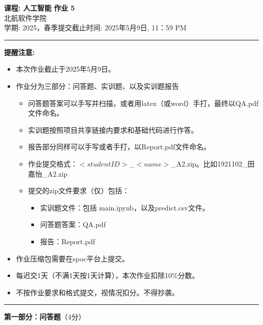 \documentclass[a4paper, 11pt]{article}
\begin{document}
\begin{CJK}{UTF8}{gbsn}
\noindent
\large\textbf{课程: 人工智能} \hfill \textbf{作业 5}   \\
北航软件学院 \\
\normalsize 学期: 2025，春季\hfill 提交截止时间:  2025年5月9日, 11：59 PM \\
\noindent\rule{7in}{2.8pt}
\textbf{提醒注意:}
\begin{itemize}
\item 本次作业截止于2025年5月9日。
\item 作业分为三部分：问答题、实训题、以及实训题报告
\begin{itemize}
    \item 问答题答案可以手写并扫描，或者用latex（或word）手打，最终以QA.pdf文件命名。
    \item 实训题按照项目共享链接内要求和基础代码进行作答。
    \item 报告部分同样可以手写或者手打，以Report.pdf文件命名。
    \item 作业提交格式：$<student ID>$\_$<name>$\_A2.zip。比如1921102\_田嘉怡\_A2.zip
    \item 提交的zip文件要求（仅）包括：
    \begin{itemize}
        \item 实训题文件：包括 main.ipynb，以及predict.csv文件。
        \item 问答题答案：QA.pdf
        \item 报告：Report.pdf
    \end{itemize}
    
\end{itemize}
\item 作业压缩包需要在spoc平台上提交。
\item 每迟交1天（不满1天按1天计算），本次作业扣除10\%分数。
\item 不按作业要求和格式提交，视情况扣分。不得抄袭。
\end{itemize}

\noindent\rule{7in}{1pt}
\textbf{第一部分：问答题}（4分）




\end{CJK}
\end{document}
